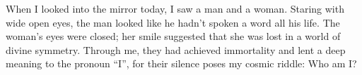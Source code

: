 \documentclass{article}
\begin{document}
\newline

When I looked into the mirror today, I saw a man and a woman. Staring
with wide open eyes, the man looked like he hadn't spoken a word all his
life. The woman's eyes were closed; her smile suggested that she was
lost in a world of divine symmetry. Through me, they had achieved
immortality and lent a deep meaning to the pronoun ``I'', for their
silence poses my cosmic riddle: Who am I?
\end{document}
